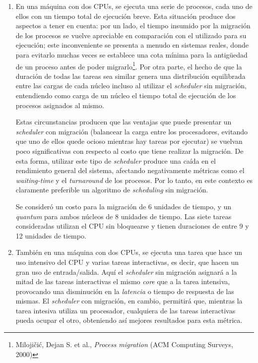 \begin{enumerate}
    \item En una máquina con dos CPUs, se ejecuta una serie de procesos, cada
    uno de ellos con un tiempo total de ejecución breve. Esta situación
    produce dos aspectos a tener en cuenta: por un lado, el tiempo insumido
    por la migración de los procesos se vuelve apreciable en comparación con
    el utilizado para su ejecución; este inconveniente se presenta a menudo en
    sistemas reales, donde para evitarlo muchas veces se establece una cota
    mínima para la antigüedad de un proceso antes de poder
    migrarlo\footnote{Milojičić, Dejan S. et al., \emph{Process migration}
    (ACM Computing Surveys, 2000)}. Por otra parte, el hecho de que la
    duración de todas las tareas sea similar genera una distribución
    equilibrada entre las cargas de cada núcleo incluso al utilizar el
    \emph{scheduler} sin migración, entendiendo como carga de un núcleo el
    tiempo total de ejecución de los procesos asignados al mismo.

    Estas circunstancias producen que las ventajas que puede presentar un
    \emph{scheduler} con migración (balancear la carga entre los procesadores,
    evitando que uno de ellos quede ocioso mientras hay tareas por ejecutar)
    se vuelvan poco significativas con respecto al costo que tiene realizar la
    migración. De esta forma, utilizar este tipo de \emph{scheduler}
    produce una caída en el rendimiento general del sistema, afectando
    negativamente métricas como el \emph{waiting-time} y el \emph{turnaround}
    de los procesos. Por lo tanto, en este contexto es claramente preferible
    un algoritmo de \emph{scheduling} sin migración.

    Se consideró un costo para la migración de 6 unidades de tiempo, y un
    \emph{quantum} para ambos núcleos de 8 unidades de tiempo. Las siete
    tareas consideradas utilizan el CPU sin bloquearse y tienen duraciones de
    entre 9 y 12 unidades de tiempo.

    \item También en una máquina con dos CPUs, se ejecuta una tarea que hace
    un uso intensivo del CPU y varias tareas interactivas, es decir, que hacen
    un gran uso de entrada/salida. Aquí el \emph{scheduler} sin migración
    asignará a la mitad de las tareas interactivas el mismo
    \emph{core} que a la tarea intensiva, provocando una disminución en la 
    \emph{latencia} o tiempo de respuesta de las mismas. El \emph{scheduler}
    con migración, en cambio, permitirá que, mientras la tarea intesiva
    utiliza un procesador, cualquiera de las tareas interactivas pueda ocupar
    el otro, obteniendo así mejores resultados para esta métrica.


\end{enumerate}
